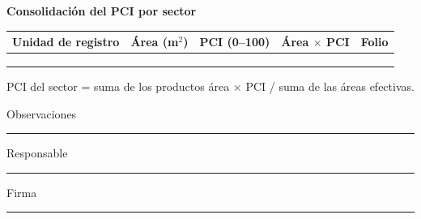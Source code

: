 \textbf{Consolidación del PCI por sector}\par
\begin{tabularx}{\linewidth}{|X|p{1.6cm}|p{1.9cm}|p{1.8cm}|p{1.25cm}|}
\hline
\textbf{Unidad de registro} & \textbf{Área (m$^2$)} & \textbf{PCI (0--100)} & \textbf{Área $\times$ PCI} & \textbf{Folio}\\\hline
\rule{0pt}{4mm}&&&&\\\hline
\rule{0pt}{4mm}&&&&\\\hline
\rule{0pt}{4mm}&&&&\\\hline
\end{tabularx}
PCI del sector = suma de los productos área $\times$ PCI / suma de las áreas efectivas.\par
Observaciones \rule{9.0cm}{0.25pt}\par
Responsable \rule{3.8cm}{0.25pt}\qquad Firma \rule{3.1cm}{0.25pt}
\endgroup
